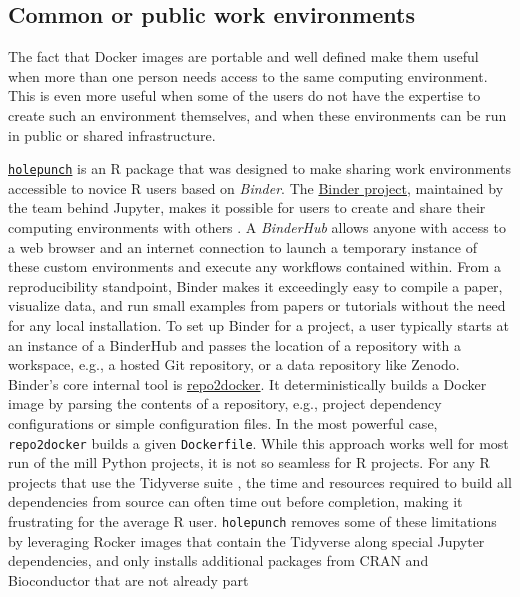 \hypertarget{common-or-public-work-environments}{%
\subsection{Common or public work
environments}\label{common-or-public-work-environments}}

The fact that Docker images are portable and well defined make them
useful when more than one person needs access to the same computing
environment. This is even more useful when some of the users do not have
the expertise to create such an environment themselves, and when these
environments can be run in public or shared infrastructure.

\href{https://github.com/karthik/holepunch}{\texttt{holepunch}} is an R
package that was designed to make sharing work environments accessible
to novice R users based on \emph{Binder}. The
\href{https://mybinder.readthedocs.io/en/latest/}{Binder project},
maintained by the team behind Jupyter, makes it possible for users to
create and share their computing environments with others
\citep{jupyter_binder_2018}. A \emph{BinderHub} allows anyone with
access to a web browser and an internet connection to launch a temporary
instance of these custom environments and execute any workflows
contained within. From a reproducibility standpoint, Binder makes it
exceedingly easy to compile a paper, visualize data, and run small
examples from papers or tutorials without the need for any local
installation. To set up Binder for a project, a user typically starts at
an instance of a BinderHub and passes the location of a repository with
a workspace, e.g., a hosted Git repository, or a data repository like
Zenodo. Binder's core internal tool is
\href{https://repo2docker.readthedocs.io/en/latest/config_files.html}{repo2docker}.
It deterministically builds a Docker image by parsing the contents of a
repository, e.g., project dependency configurations or simple
configuration files. In the most powerful case, \texttt{repo2docker}
builds a given \texttt{Dockerfile}. While this approach works well for
most run of the mill Python projects, it is not so seamless for R
projects. For any R projects that use the Tidyverse suite
\citep{wickham_welcome_2019}, the time and resources required to build
all dependencies from source can often time out before completion,
making it frustrating for the average R user. \texttt{holepunch} removes
some of these limitations by leveraging Rocker images that contain the
Tidyverse along special Jupyter dependencies, and only installs
additional packages from CRAN and Bioconductor that are not already part

